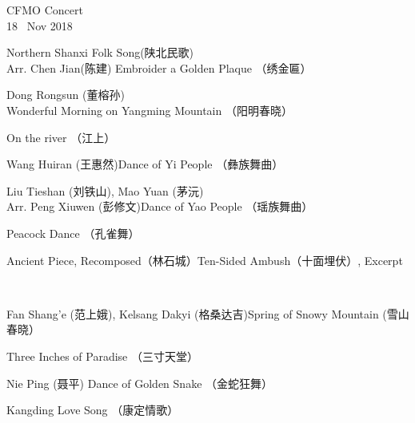 \documentclass[letter,6pt,poets]{ConcProg}
\begin{document}
\begin{programme}{
    CFMO Concert
\\  {\normalsize 18 ~Nov 2018}
}
\begin{part}[]
    \begin{composition}{Northern Shanxi Folk Song(陕北民歌)\\Arr. Chen Jian(陈建)} {}{Embroider a Golden Plaque  （绣金匾）}{}
    \end{composition}
    \begin{composition}{Dong Rongsun (董榕孙)} {}{Wonderful Morning on Yangming Mountain  （阳明春晓）
}{}
    \end{composition}
    \begin{composition}{} {}{On the river （江上）}{}
    \end{composition}
    \begin{composition}{Wang Huiran (王惠然)}{}{Dance of Yi People  （彝族舞曲）}{}
    \end{composition}
    \begin{composition}{Liu Tieshan (刘铁山), Mao Yuan (茅沅) \\Arr. Peng Xiuwen (彭修文)}{}{Dance of Yao People  （瑶族舞曲）}{}
    \end{composition}
    \begin{composition}{}{}{Peacock Dance （孔雀舞） }{}
    \end{composition}
    \begin{composition}{Ancient Piece, Recomposed（林石城）}{}{Ten-Sided Ambush（十面埋伏）, Excerpt}{}
    \end{composition}\\
    \begin{composition}{Fan Shang'e (范上娥), Kelsang Dakyi (格桑达吉)}{}{Spring of Snowy Mountain   (雪山春晓）}{}
                   {}{}
    \end{composition}
    \begin{composition}{}{}{Three Inches of Paradise  （三寸天堂）}{}
    \end{composition}
    \begin{composition}{Nie Ping (聂平)} {}{Dance of Golden Snake  （金蛇狂舞）}{}
    \end{composition}
    \begin{composition}{}{}{Kangding Love Song  （康定情歌）}{}

\end{composition}
\end{part}
\end{programme}
\end{document}
